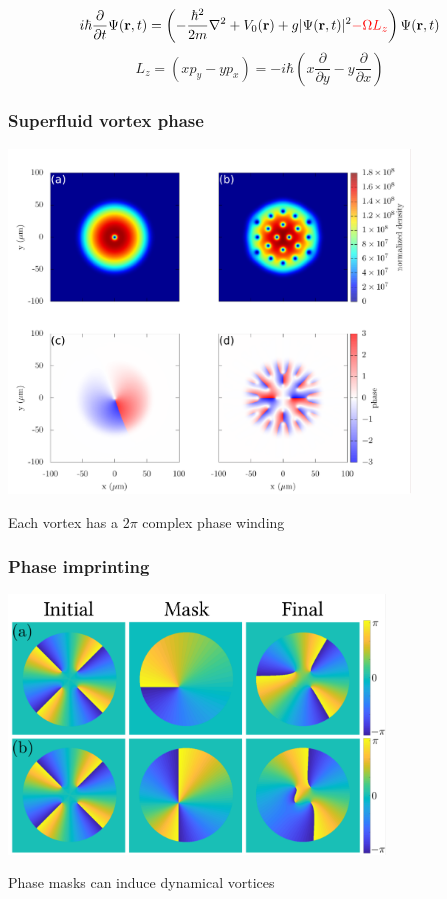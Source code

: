 \documentclass{beamer}
\begin{document}
\begin{frame}
\pause
\begin{equation*}
    i\hbar \frac{\partial}{\partial t}\Psi(\mathbf{r},t) = \left( - \frac{\hbar^2}{2m} \nabla^2 + V_0(\mathbf{r}) + g |\Psi(\mathbf{r},t)|^2 {\color{red}{-\Omega L_z}} \right)\Psi(\mathbf{r},t)
\end{equation*}
$$
L_z = (xp_y - yp_x) = -i\hbar\left(x\frac{\partial}{\partial y} - y\frac{\partial}{\partial x} \right)
$$

\end{frame}

\begin{frame}
\frametitle{Superfluid vortex phase}
\center \includegraphics[width=0.8\textwidth]{../data/splitop/rot/WIP.pdf}

Each vortex has a $2\pi$ complex phase winding
\end{frame}

\begin{frame}
\frametitle{Phase imprinting}
\center \includegraphics[width=0.75\textwidth]{phase}


Phase masks can induce dynamical vortices

\end{frame}
\end{document}

